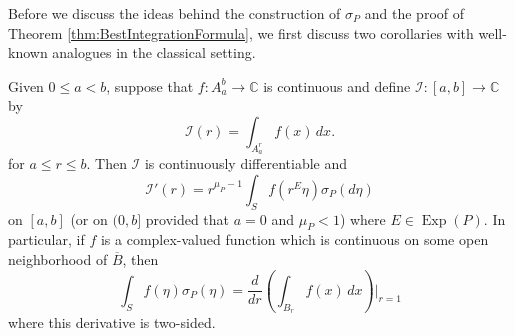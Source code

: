 \documentclass[smallextended]{svjour3}
\theoremstyle{remark}
\newcommand\Exp{\operatorname{Exp}}
\begin{document}
\noindent 


\noindent Before we discuss the ideas behind the construction of $\sigma_P$ and the proof of Theorem \ref{thm:BestIntegrationFormula}, we first discuss two corollaries with well-known analogues in the classical setting. 

\begin{corollary}
Given $0\leq a<b$, suppose that $f:A_a^b\to\mathbb{C}$ is continuous and define $\mathcal{I}:[a,b]\to\mathbb{C}$ by
\begin{equation*}
\mathcal{I}(r)=\int_{A_a^r}f(x)\,dx.
\end{equation*}
for $a\leq r\leq b$. Then $\mathcal{I}$ is continuously differentiable and
\begin{equation*}
\mathcal{I}'(r)=r^{\mu_P-1}\int_S f(r^E\eta)\sigma_P(d\eta)
\end{equation*}
on $[a,b]$ (or on $(0,b]$ provided that $a=0$ and $\mu_P<1$) where $E\in\Exp(P)$. In particular, if $f$ is a complex-valued function which is continuous on some open neighborhood of $\overline{B}$, then
\begin{equation*}
\int_S f(\eta)\sigma_P(\eta)=\frac{d}{dr}\left(\int_{B_r}f(x)\,dx\right)\bigg\vert_{r=1}
\end{equation*}
where this derivative is two-sided.
\end{corollary}
\end{document}
